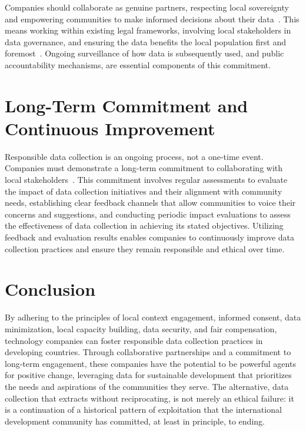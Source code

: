 \documentclass[11pt,showkeys]{essay}
\begin{document}
Companies should collaborate as genuine partners, respecting local sovereignty and empowering communities to make informed decisions about their data~\cite{edwards_slave_2017}. This means working within existing legal frameworks, involving local stakeholders in data governance, and ensuring the data benefits the local population first and foremost~\cite{jobin_global_2019}. Ongoing surveillance of how data is subsequently used, and public accountability mechanisms, are essential components of this commitment.

\section{Long-Term Commitment and Continuous Improvement}

Responsible data collection is an ongoing process, not a one-time event. Companies must demonstrate a long-term commitment to collaborating with local stakeholders~\cite{runde_innovative_2022}. This commitment involves regular assessments to evaluate the impact of data collection initiatives and their alignment with community needs, establishing clear feedback channels that allow communities to voice their concerns and suggestions, and conducting periodic impact evaluations to assess the effectiveness of data collection in achieving its stated objectives. Utilizing feedback and evaluation results enables companies to continuously improve data collection practices and ensure they remain responsible and ethical over time.

\section{Conclusion}

By adhering to the principles of local context engagement, informed consent, data minimization, local capacity building, data security, and fair compensation, technology companies can foster responsible data collection practices in developing countries. Through collaborative partnerships and a commitment to long-term engagement, these companies have the potential to be powerful agents for positive change, leveraging data for sustainable development that prioritizes the needs and aspirations of the communities they serve. The alternative, data collection that extracts without reciprocating, is not merely an ethical failure: it is a continuation of a historical pattern of exploitation that the international development community has committed, at least in principle, to ending.


\end{document}
